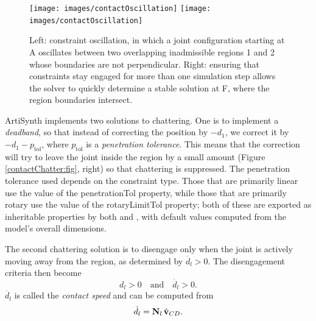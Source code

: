 \begin{figure}[th]
\begin{center}
\iflatexml
 \texttt{[image: images/contactOscillation]}
\else
 \texttt{[image: images/contactOscillation]}
\fi
\end{center}
\caption{Left: constraint oscillation, in which a joint configuration
starting at A oscillates between two overlapping inadmissible
regions 1 and 2 whose boundaries are not perpendicular. Right:
ensuring that constraints stay engaged for more than one simulation
step allows the solver to quickly determine a stable solution at F,
where the region boundaries intersect.}
\label{contactOscillation:fig}
\end{figure}

ArtiSynth implements two solutions to chattering. One is to implement
a {\it deadband}, so that instead of correcting the position by
$-d_1$, we correct it by $-d_1 - p_\text{tol}$, where $p_\text{tol}$
is a {\it penetration tolerance}. This means that the correction will
try to leave the joint inside the region by a small amount (Figure
\ref{contactChatter:fig}, right) so that chattering is suppressed. The
penetration tolerance used depends on the constraint type. Those that
are primarily linear use the value of the {\sf penetrationTol}
property, while those that are primarily rotary use the value of the
{\sf rotaryLimitTol} property; both of these are exported as
inheritable properties by both
 and
, with default
values computed from the model's overall dimensions.

The second chattering solution is to disengage only when the joint is
actively moving away from the region, as determined by $\dot{d_l} > 0$.
The disengagement criteria then become
%
\begin{equation}
d_l > 0 \quad \text{and} \quad \dot{d_l} > 0.
\label{disengage:eqn}
\end{equation}
%
$\dot{d_l}$ is called the {\it contact speed} and can be computed from
%
\begin{equation}
\dot{d_l} = {\bf N}_l \, \hat{{\bf v}}_{CD}.
\end{equation}
%

